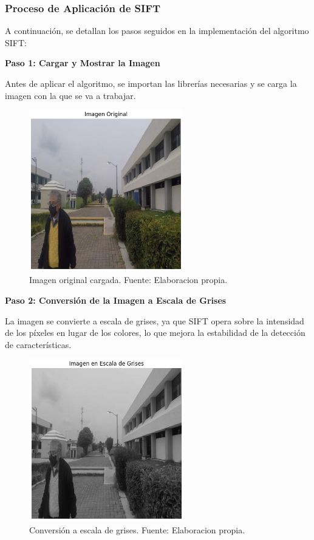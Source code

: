 \documentclass[a4paper]{article}
\begin{document}
\subsubsection{Proceso de Aplicación de SIFT}

A continuación, se detallan los pasos seguidos en la implementación del algoritmo SIFT:
\par\vspace{0.5cm}

\textbf{Paso 1: Cargar y Mostrar la Imagen}
\par\vspace{0.5cm}

Antes de aplicar el algoritmo, se importan las librerías necesarias y se carga la imagen con la que se va a trabajar.

\begin{figure}[H]
    \centering
    \includegraphics[width=0.6\textwidth]{images/sift_paso_1.png}
    \caption{Imagen original cargada. Fuente: Elaboracion propia.}
\end{figure}

\textbf{Paso 2: Conversión de la Imagen a Escala de Grises}

La imagen se convierte a escala de grises, ya que SIFT opera sobre la intensidad de los píxeles en lugar de los colores, lo que mejora la estabilidad de la detección de características.

\begin{figure}[H]
    \centering
    \includegraphics[width=0.6\textwidth]{images/sift_paso_2.png}
    \caption{Conversión a escala de grises. Fuente: Elaboracion propia.}
\end{figure}
\end{document}

